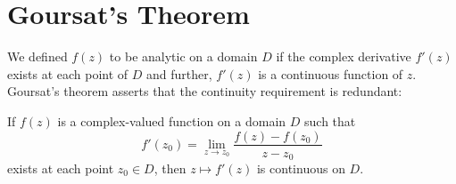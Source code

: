 \section{Goursat's Theorem}

We defined $f(z)$ to be analytic on a domain $D$ if the complex derivative $f'(z)$ exists at each point of $D$ and further, $f'(z)$ is a continuous function of $z$. Goursat's theorem asserts that the continuity requirement is redundant:

\begin{theorem}
    If $f(z)$ is a complex-valued function on a domain $D$ such that \begin{equation*}
        f'(z_0) = \lim\limits_{z\rightarrow z_0}\frac{f(z)-f(z_0)}{z-z_0}
    \end{equation*}
    exists at each point $z_0 \in D$, then $z\mapsto f'(z)$ is continuous on $D$.
\end{theorem}
